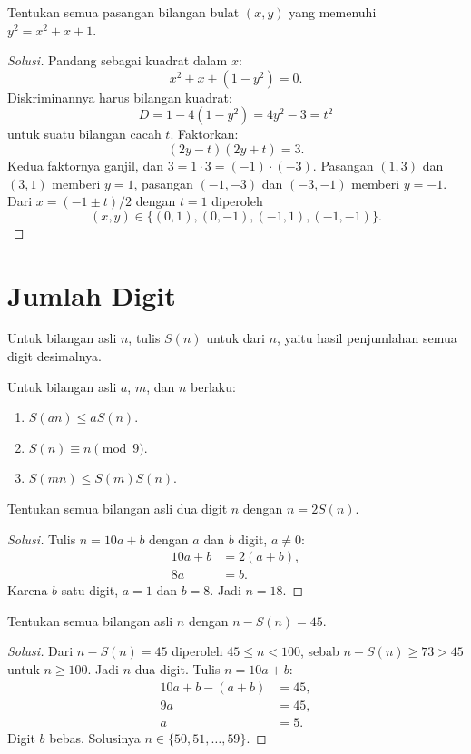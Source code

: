 \documentclass[12pt]{scrartcl}
\begin{document}
\begin{example}
Tentukan semua pasangan bilangan bulat $(x, y)$ yang memenuhi $y^2 = x^2 + x + 1$.
\end{example}
\begin{proof}[Solusi]
Pandang sebagai kuadrat dalam $x$:
\[ x^2 + x + (1 - y^2) = 0. \]
Diskriminannya harus bilangan kuadrat:
\[ D = 1 - 4(1 - y^2) = 4y^2 - 3 = t^2 \]
untuk suatu bilangan cacah $t$. Faktorkan:
\[ (2y - t)(2y + t) = 3. \]
Kedua faktornya ganjil, dan $3 = 1 \cdot 3 = (-1) \cdot (-3)$.
Pasangan $(1, 3)$ dan $(3, 1)$ memberi $y = 1$,
pasangan $(-1, -3)$ dan $(-3, -1)$ memberi $y = -1$.
Dari $x = (-1 \pm t)/2$ dengan $t = 1$ diperoleh
\[ (x, y) \in \{(0, 1), (0, -1), (-1, 1), (-1, -1)\}. \]
\end{proof}

\section{Jumlah Digit}

\begin{definition}
Untuk bilangan asli $n$, tulis $S(n)$ untuk 
dari $n$, yaitu hasil penjumlahan semua digit desimalnya.
\end{definition}

\begin{fact}
Untuk bilangan asli $a$, $m$, dan $n$ berlaku:
\begin{enumerate}
    \item $S(an) \le aS(n)$.
    \item $S(n) \equiv n \pmod{9}$.
    \item $S(mn) \le S(m)S(n)$.
\end{enumerate}
\end{fact}

\begin{example}
Tentukan semua bilangan asli dua digit $n$ dengan $n = 2S(n)$.
\end{example}
\begin{proof}[Solusi]
Tulis $n = 10a + b$ dengan $a$ dan $b$ digit, $a \ne 0$:
\begin{align*}
10a + b &= 2(a + b), \\
8a &= b.
\end{align*}
Karena $b$ satu digit, $a = 1$ dan $b = 8$.
Jadi $n = 18$.
\end{proof}

\begin{example}
Tentukan semua bilangan asli $n$ dengan $n - S(n) = 45$.
\end{example}
\begin{proof}[Solusi]
Dari $n - S(n) = 45$ diperoleh $45 \le n < 100$,
sebab $n - S(n) \ge 73 > 45$ untuk $n \ge 100$.
Jadi $n$ dua digit. Tulis $n = 10a + b$:
\begin{align*}
10a + b - (a + b) &= 45, \\
9a &= 45, \\
a &= 5.
\end{align*}
Digit $b$ bebas. Solusinya $n \in \{50, 51, \dots, 59\}$.
\end{proof}
\end{document}
